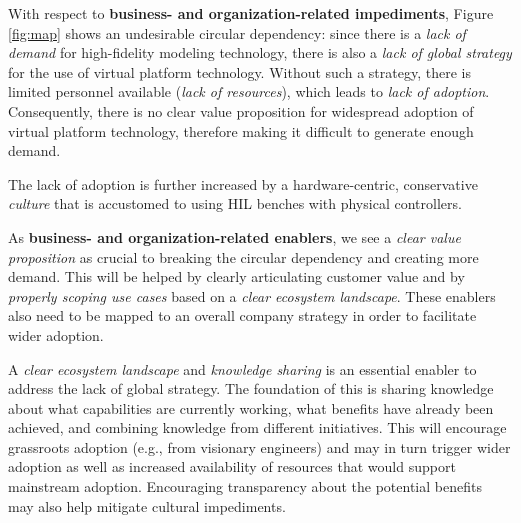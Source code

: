 With respect to \textbf{business- and organization-related impediments}, Figure \ref{fig:map} shows an undesirable circular dependency:
since there is a \emph{lack of demand} for high-fidelity modeling technology,
there is also a \emph{lack of global strategy} for the use of virtual platform technology.
Without such a strategy, there is limited personnel available (\emph{lack of resources}),
which leads to \emph{lack of adoption}.
Consequently, there is no clear value proposition for widespread adoption of virtual platform technology, therefore making it difficult to generate enough demand.

The lack of adoption is further increased by a hardware-centric, conservative \emph{culture} that is accustomed to using HIL benches with physical controllers.

As \textbf{business- and organization-related enablers}, %
we see a \emph{clear value proposition} as crucial to breaking the circular dependency and creating more demand.
This will be helped by clearly articulating customer value and by \emph{properly scoping use cases} based on a \emph{clear ecosystem landscape}.
These enablers also need to be mapped to an overall company strategy in order to facilitate wider adoption. 

A \emph{clear ecosystem landscape} and \emph{knowledge sharing} %
{is an essential enabler to address} the lack of global strategy.
The foundation of this is sharing knowledge about what capabilities are currently working, what benefits have already been achieved, and combining knowledge from different initiatives.
This will encourage grassroots adoption (e.g., from visionary engineers) and may in turn trigger wider adoption
as well as increased availability of resources that would support mainstream adoption. Encouraging transparency about the potential benefits may also help mitigate cultural impediments.

